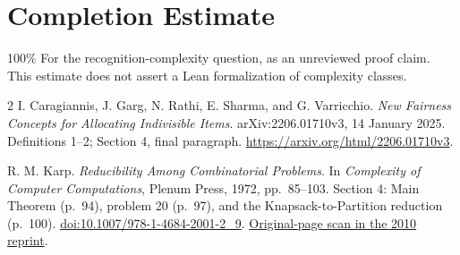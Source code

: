 \documentclass[11pt]{article}
\begin{document}
\section*{Completion Estimate}
100\%
For the recognition-complexity question, as an unreviewed proof claim.
This estimate does not assert a Lean formalization of complexity classes.

\begin{thebibliography}{2}
\small
{}
I. Caragiannis, J. Garg, N. Rathi, E. Sharma, and G. Varricchio.
\emph{New Fairness Concepts for Allocating Indivisible Items}.
arXiv:2206.01710v3, 14 January 2025.
Definitions 1--2; Section 4, final paragraph.
\url{https://arxiv.org/html/2206.01710v3}.

R. M. Karp. \emph{Reducibility Among Combinatorial Problems}.
In \emph{Complexity of Computer Computations}, Plenum Press, 1972,
pp.~85--103. Section 4: Main Theorem (p.~94), problem 20 (p.~97),
and the Knapsack-to-Partition reduction (p.~100).
\href{https://doi.org/10.1007/978-1-4684-2001-2_9}{doi:10.1007/978-1-4684-2001-2\_9}.
\href{https://www.cs.umd.edu/~gasarch/BLOGPAPERS/Karp.pdf}{Original-page scan in the 2010 reprint}.
\end{thebibliography}
\end{document}
